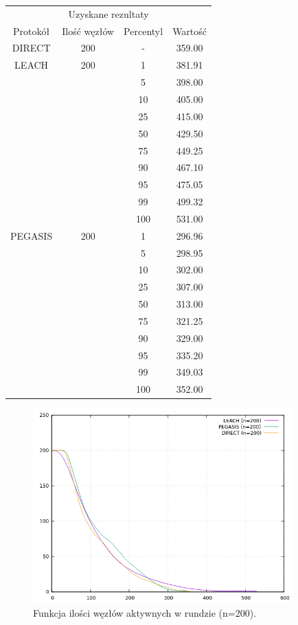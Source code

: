 \documentclass[a4paper,12pt,twoside,openany]{report}
\begin{document}
\begin{longtable}{*{4}{c}}
\toprule
\multicolumn{4}{c}{Uzyskane rezultaty} \\
Protokół	& Ilość węzłów	& Percentyl	& Wartość \\
\midrule
\endhead
DIRECT	& 200 	& -	& 359.00 \\*
\midrule
LEACH	& 200	& 1	& 381.91 \\*
	&	& 5	& 398.00 \\*
	&	& 10	& 405.00 \\*
	&	& 25	& 415.00 \\*
	&	& 50	& 429.50 \\*
	&	& 75	& 449.25 \\*
	&	& 90	& 467.10 \\*
	&	& 95	& 475.05 \\*
	&	& 99	& 499.32 \\*
	&	& 100	& 531.00 \\*
\midrule
PEGASIS	& 200	& 1	& 296.96 \\*
	&	& 5	& 298.95 \\*
	&	& 10	& 302.00 \\*
	&	& 25	& 307.00 \\*
	&	& 50	& 313.00 \\*
	&	& 75	& 321.25 \\*
	&	& 90	& 329.00 \\*
	&	& 95	& 335.20 \\*
	&	& 99	& 349.03 \\*
	&	& 100	& 352.00 \\*
\bottomrule
\end{longtable}

\begin{figure}[H]
 \centering
 \includegraphics[width=10cm]{images/gnuplot/test_2/nodes_in_round_200.png}
 \caption{Funkcja ilości węzłów aktywnych w rundzie (n=200).}
\end{figure}
\end{document}
